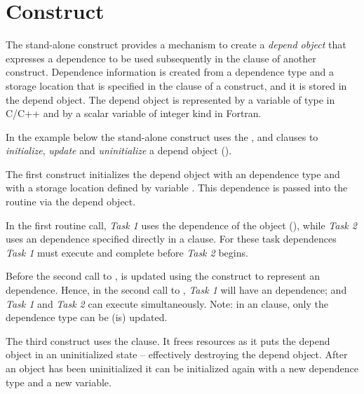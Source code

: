 \section{ Construct}
\label{sec:depobj}

The stand-alone  construct provides a mechanism 
to create a \emph{depend object} that expresses a dependence to be 
used subsequently in the  clause of another construct.
Dependence information is created from a dependence type and a storage location
that is specified in the  clause of a  construct,
and it is stored in the depend object.
The depend object is represented by a variable of type  
in C/C++ and by a scalar variable of integer kind  in Fortran.

In the example below the stand-alone  construct uses the 
,  and  clauses to 
\emph{initialize}, \emph{update} and \emph{uninitialize}
a depend object ().

The first  construct initializes the  
depend object with 
an  dependence type and with a storage
location defined by variable .  
This dependence is passed into the  
routine via the  depend object.

In the first  routine call, \emph{Task 1} uses
the dependence of the object (), 
while \emph{Task 2} uses an  dependence specified 
directly in a  clause.
For these task dependences \emph{Task 1} must execute and 
complete before \emph{Task 2} begins.

Before the second call to ,  is updated 
using the  construct to represent an  dependence. 
Hence, in the second call to , \emph{Task 1}
will have an  dependence; and \emph{Task 1} and 
\emph{Task 2} can execute simultaneously. Note: in an 
clause, only the dependence type can be (is) updated.

The third  construct uses the  clause.
It frees resources as it puts the depend object in an uninitialized state --
effectively destroying the depend object.
After an object has been uninitialized it can be initialized again
with a new dependence type and a new variable.


